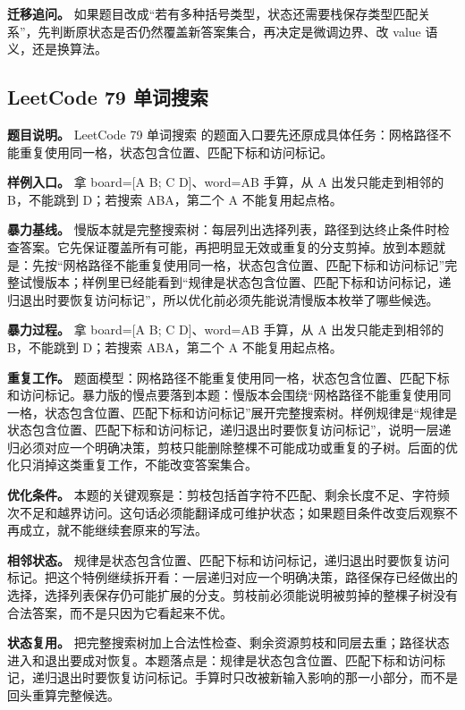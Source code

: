 \textbf{迁移追问。} 如果题目改成“若有多种括号类型，状态还需要栈保存类型匹配关系”，先判断原状态是否仍然覆盖新答案集合，再决定是微调边界、改 value 语义，还是换算法。

\subsection{LeetCode 79 单词搜索}

\textbf{题目说明。} LeetCode 79 单词搜索 的题面入口要先还原成具体任务：网格路径不能重复使用同一格，状态包含位置、匹配下标和访问标记。

\textbf{样例入口。} 拿 board=[A B; C D]、word=AB 手算，从 A 出发只能走到相邻的 B，不能跳到 D；若搜索 ABA，第二个 A 不能复用起点格。

\textbf{暴力基线。} 慢版本就是完整搜索树：每层列出选择列表，路径到达终止条件时检查答案。它先保证覆盖所有可能，再把明显无效或重复的分支剪掉。放到本题就是：先按“网格路径不能重复使用同一格，状态包含位置、匹配下标和访问标记”完整试慢版本；样例里已经能看到“规律是状态包含位置、匹配下标和访问标记，递归退出时要恢复访问标记”，所以优化前必须先能说清慢版本枚举了哪些候选。

\textbf{暴力过程。} 拿 board=[A B; C D]、word=AB 手算，从 A 出发只能走到相邻的 B，不能跳到 D；若搜索 ABA，第二个 A 不能复用起点格。

\textbf{重复工作。} 题面模型：网格路径不能重复使用同一格，状态包含位置、匹配下标和访问标记。暴力版的慢点要落到本题：慢版本会围绕“网格路径不能重复使用同一格，状态包含位置、匹配下标和访问标记”展开完整搜索树。样例规律是“规律是状态包含位置、匹配下标和访问标记，递归退出时要恢复访问标记”，说明一层递归必须对应一个明确决策，剪枝只能删除整棵不可能成功或重复的子树。后面的优化只消掉这类重复工作，不能改变答案集合。

\textbf{优化条件。} 本题的关键观察是：剪枝包括首字符不匹配、剩余长度不足、字符频次不足和越界访问。这句话必须能翻译成可维护状态；如果题目条件改变后观察不再成立，就不能继续套原来的写法。

\textbf{相邻状态。} 规律是状态包含位置、匹配下标和访问标记，递归退出时要恢复访问标记。把这个特例继续拆开看：一层递归对应一个明确决策，路径保存已经做出的选择，选择列表保存仍可能扩展的分支。剪枝前必须能说明被剪掉的整棵子树没有合法答案，而不是只因为它看起来不优。

\textbf{状态复用。} 把完整搜索树加上合法性检查、剩余资源剪枝和同层去重；路径状态进入和退出要成对恢复。本题落点是：规律是状态包含位置、匹配下标和访问标记，递归退出时要恢复访问标记。手算时只改被新输入影响的那一小部分，而不是回头重算完整候选。

